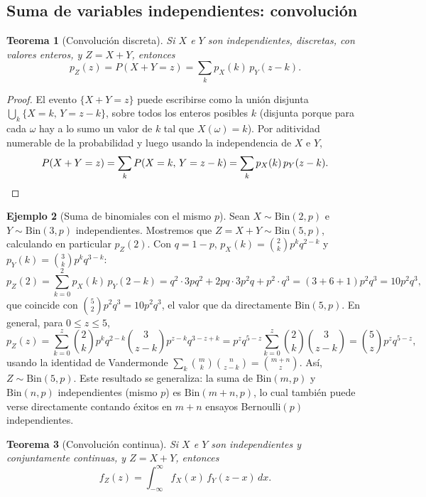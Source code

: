 \documentclass[11pt,a4paper]{article}
\theoremstyle{plain}
\newtheorem{teorema}{Teorema}[section]
\theoremstyle{definition}
\newtheorem{ejemplo}[teorema]{Ejemplo}
\theoremstyle{remark}
\begin{document}
\subsection{Suma de variables independientes: convolución}

\begin{teorema}[Convolución discreta]\label{teo:convolucion-discreta}
Si $X$ e $Y$ son independientes, discretas, con valores enteros, y $Z=X+Y$, entonces
\[
p_Z(z) = P(X+Y=z) = \sum_k p_X(k)\,p_Y(z-k).
\]
\end{teorema}

\begin{proof}
El evento $\{X+Y=z\}$ puede escribirse como la unión disjunta $\bigcup_k \{X=k,\,Y=z-k\}$, sobre todos los enteros posibles $k$ (disjunta porque para cada $\omega$ hay a lo sumo un valor de $k$ tal que $X(\omega)=k$). Por aditividad numerable de la probabilidad y luego usando la independencia de $X$ e $Y$,
\[
P(X+Y=z) = \sum_k P(X=k,\,Y=z-k) = \sum_k p_X(k)\,p_Y(z-k). \qedhere
\]
\end{proof}

\begin{ejemplo}[Suma de binomiales con el mismo $p$]
Sean $X\sim\text{Bin}(2,p)$ e $Y\sim\text{Bin}(3,p)$ independientes. Mostremos que $Z=X+Y\sim\text{Bin}(5,p)$, calculando en particular $p_Z(2)$. Con $q=1-p$, $p_X(k)=\binom2k p^kq^{2-k}$ y $p_Y(k)=\binom3k p^kq^{3-k}$:
\[
p_Z(2) = \sum_{k=0}^2 p_X(k)\,p_Y(2-k) = q^2\cdot3pq^2 + 2pq\cdot3p^2q + p^2\cdot q^3 = (3+6+1)p^2q^3 = 10p^2q^3,
\]
que coincide con $\binom52p^2q^3=10p^2q^3$, el valor que da directamente $\text{Bin}(5,p)$. En general, para $0\le z\le5$,
\[
p_Z(z) = \sum_{k=0}^z \binom2k p^kq^{2-k}\binom{3}{z-k}p^{z-k}q^{3-z+k} = p^zq^{5-z}\sum_{k=0}^z\binom2k\binom{3}{z-k} = \binom5z p^zq^{5-z},
\]
usando la identidad de Vandermonde $\sum_k\binom{m}{k}\binom{n}{z-k}=\binom{m+n}{z}$. Así, $Z\sim\text{Bin}(5,p)$. Este resultado se generaliza: la suma de $\text{Bin}(m,p)$ y $\text{Bin}(n,p)$ independientes (mismo $p$) es $\text{Bin}(m+n,p)$, lo cual también puede verse directamente contando éxitos en $m+n$ ensayos Bernoulli$(p)$ independientes.
\end{ejemplo}

\begin{teorema}[Convolución continua]\label{teo:convolucion-continua}
Si $X$ e $Y$ son independientes y conjuntamente continuas, y $Z=X+Y$, entonces
\[
f_Z(z) = \int_{-\infty}^{\infty} f_X(x)\,f_Y(z-x)\,dx.
\]
\end{teorema}
\end{document}

